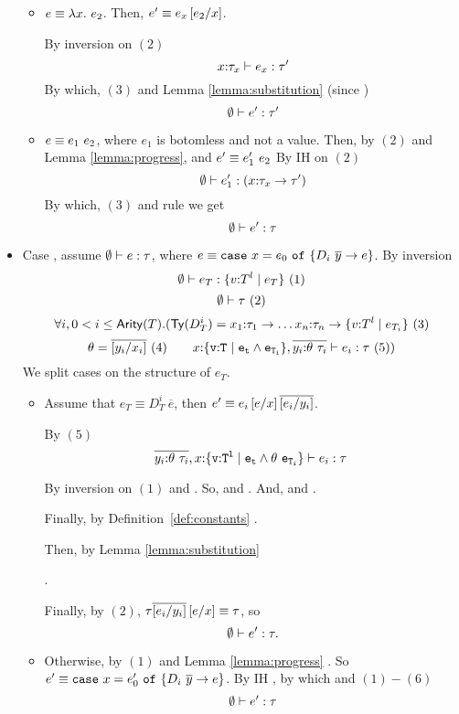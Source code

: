 \begin{itemize}
\begin{itemize}
\item $e \equiv \eapp{\efun{x}{e_x}}{e_2}$.
Then, $e' \equiv e_x\sub{x}{e_2}$.

By inversion on $(2)$
$$
	\hastype{x\colon\tau_x}{e_x}{\tau'}
$$
By which, $(3)$ and Lemma \ref{lemma:substitution} (since )
$$\hastype{\emptyset}{e'}{\tau'}$$

\item $e \equiv \eapp{e_1}{e_2}$, where $e_1$ is botomless and not a value.
Then, by $(2)$ and Lemma \ref{lemma:progress},  and 
$e'\equiv\eapp{e_1'}{e_2}$
By IH on $(2)$
$$	\hastype{\emptyset}{e_1'}{(\tfun{x}{\tau_{x}}{\tau'})}
$$
By which, $(3)$ and rule \rtapp we get
$$	\hastype{\emptyset}{e'}{\tau}$$
\end{itemize}
\item Case \rtcase, assume $\hastype{\emptyset}{e}{\tau}$, 
where $e \equiv \ecase{e_0}{D_i}{\overline{y}}{e}{x}$.
By inversion
$$	\hastype{\emptyset}{e_T}{\tref{v}{T}{l}{e_T}}\ (1) $$
$$	 \iswellformed{\emptyset}{\tau}\ (2)$$
$$	\forall i, 0 < i \leq \arity{T}. (
		\constty{D^i_T} = \tfun{x_1}{\tau_1}{\dots\tfun{x_n}{\tau_n}{\tref{v}{T}{l}{e_{T_i}}}}\ (3)
$$
$$		\theta = \overline{\sub{x_i}{y_i}}\ (4) \qquad
		\hastype{x\colon\tlref{v}{T}{}{e_t \land e_{T_i}}, 
						\overline{y_i\colon \theta\ \tau_i}}{e_i}{\tau}\ (5)	
	)
$$
We split cases on the structure of $e_T$.
\begin{itemize}
\item Assume that $e_T \equiv D^i_T\ \overline{e}$,
then $e' \equiv e_i \sub{x}{e} \overline{\sub{y_i}{e_i}}$.

By $(5)$
$$
		\hastype{\overline{y_i\colon \theta\ \tau_i}, 
		x\colon\tlref{v}{T}{l}{e_t \land \theta\ e_{T_i}}}{e_i}{\tau}\	
$$

By inversion on $(1)$ 
and
. 
So,
and
. 
And,
and
. 

Finally, by Definition~\ref{def:constants}
. 

Then, by Lemma \ref{lemma:substitution}

.

Finally, by $(2)$, $\tau \overline{\sub{y_i}{e_i}}\sub{x}{e} \equiv \tau$, so
$$
\hastype{\emptyset}{e'}{\tau}.
$$

\item Otherwise, by $(1)$ and Lemma \ref{lemma:progress} .
So $e' \equiv \ecase{e'_0}{D_i}{\overline{y}}{e}{x}$.
By IH , 
by which and $(1) - (6)$ $$\hastype{\emptyset}{e'}{\tau}$$
\end{itemize}

\end{itemize}